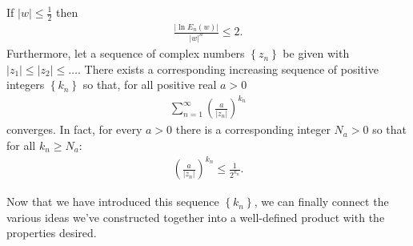 \documentclass{memoir}
\begin{document}
\begin{lemma}
	If \(\left| w \right| \leq \frac{1}{2}\) then
	\begin{align*}
		\frac{\left| \ln E_n(w) \right| }{\left| w \right|^{n}} \leq 2.
	\end{align*}
	Furthermore, let a sequence of complex numbers \(\left\{ z_n \right\} \) be given with \(\left| z_1 \right| \leq \left| z_2 \right| \leq \ldots\). There exists a corresponding increasing sequence of positive integers \(\left\{ k_n \right\} \) so that, for all positive real \(a>0\) 
	\begin{align*}
		\sum_{n=1}^{\infty} \left( \frac{a}{\left| z_n \right| } \right)^{k_n} 
	\end{align*}
	converges. In fact, for every \(a>0\) there is a corresponding integer \(N_a>0\) so that for all \(k_n \geq N_a\):
	\begin{align*}
		\left( \frac{a}{\left| z_n \right| } \right)^{k_n} \leq \frac{1}{2^{k_n}}.
	\end{align*}
\end{lemma}

Now that we have introduced this sequence \(\left\{ k_n \right\} \), we can finally connect the various ideas we've constructed together into a well-defined product with the properties desired.
\end{document}
